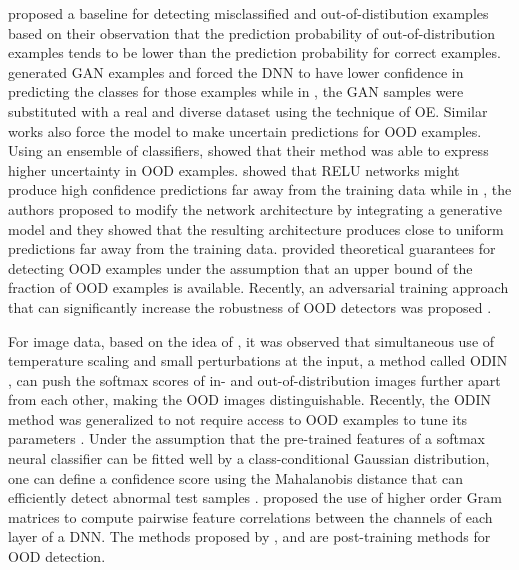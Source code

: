 \documentclass{article} \usepackage{iclr2020_conference,times}
\begin{document}
\citet{hendrycks17baseline} proposed a baseline for detecting misclassified and out-of-distibution examples based on their observation that the prediction probability of out-of-distribution examples tends to be lower than the prediction probability for correct examples. \citet{2017arXiv171109325L} generated GAN examples and forced the DNN to have lower confidence in predicting the classes for those examples while in \citet{hendrycks2019oe}, the GAN samples were substituted with a real and diverse dataset using the technique of OE. Similar works \citep{Malinin:2018:PUE:3327757.3327808, 2018arXiv180807703B} also force the model to make uncertain predictions for OOD examples. Using an ensemble of classifiers, \citet{Lakshminarayanan:2017:SSP:3295222.3295387} showed that their method was able to express higher uncertainty in OOD examples. \citet{Hein_2019_CVPR} showed that RELU networks might produce high confidence predictions far away from the training data while in \citet{Meinke2020Towards}, the authors proposed to modify the network architecture by integrating a generative model and they showed that the resulting architecture produces close to uniform predictions far away from the training data. \citet{2018arXiv180800529L} provided theoretical guarantees for detecting OOD examples under the assumption that an upper bound of the fraction of OOD examples is available. Recently, an adversarial training approach that can significantly increase the robustness of OOD detectors was proposed \citep{2020arXiv200615207C}. 

For image data, based on the idea of \cite{hendrycks17baseline}, it was observed that simultaneous use of temperature scaling \citep{Guo:2017:CMN:3305381.3305518} and small perturbations at the input, a method called ODIN \citep{2017arXiv170602690L}, can push the softmax scores of in- and out-of-distribution images further apart from each other, making the OOD images distinguishable. Recently, the ODIN method was generalized to not require access to OOD examples to tune its parameters \citep{generalized_odin}. Under the assumption that the pre-trained features of a softmax neural classifier can be fitted well by a class-conditional Gaussian distribution, one can define a confidence score using the Mahalanobis distance that can efficiently detect abnormal test samples \citep{Lee:2018:SUF:3327757.3327819}. \citet{ch2019detecting} proposed the use of higher order Gram matrices to compute pairwise feature correlations between the channels of each layer of a DNN. The methods proposed by \citet{Lee:2018:SUF:3327757.3327819}, \citet{ch2019detecting} and \citet{2017arXiv170602690L} are post-training methods for OOD detection. 
\end{document}
